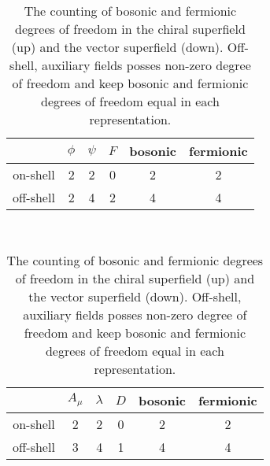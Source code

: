 \documentclass[12pt,twoside,book]{article}
\begin{document}
\begin{table}[t]
 \begin{center}
  \begin{tabular}{|c|c|c|c||c|c|}
   \hline
   & $\phi$ & $\psi$ & $F$ & bosonic & fermionic \\ \hline
   on-shell & 2 & 2 & 0 & 2 & 2 \\ \hline
   off-shell & 2 & 4 & 2 & 4 & 4 \\ \hline
  \end{tabular} \\ \vspace{5mm}
  \begin{tabular}{|c|c|c|c||c|c|}
   \hline
   & $A_\mu$ & $\lambda$ & $D$ & bosonic & fermionic \\ \hline
   on-shell & 2 & 2 & 0 & 2 & 2 \\ \hline
   off-shell & 3 & 4 & 1 & 4 & 4 \\ \hline
  \end{tabular}
 \end{center}
 \caption{The counting of bosonic and fermionic degrees of freedom in
 the chiral superfield (up) and the vector superfield (down).
 Off-shell, auxiliary fields posses non-zero degree of freedom and
 keep bosonic and fermionic degrees of freedom equal in each
 representation.}
 \label{counting}
\end{table}
\end{document}
